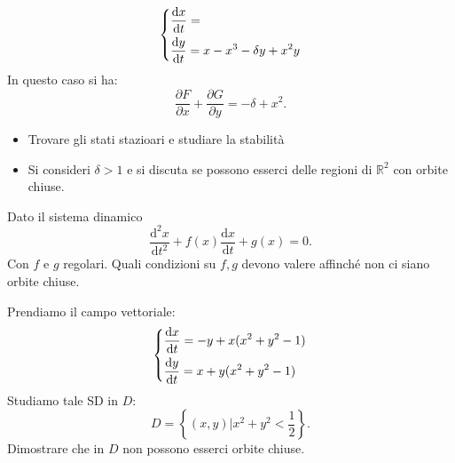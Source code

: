 \begin{ex}[]
    \[
    \begin{dcases}
    \frac{\text{d} x}{\text{d} t} = \\
    \frac{\text{d} y}{\text{d} t} = x-x^3-\delta y + x^2y
    \end{dcases}
    \]
    In questo caso si ha:
    \[
        \frac{\partial F}{\partial x} + \frac{\partial G}{\partial y} = -\delta  + x^2
    .\] 
    \begin{itemize}
        \item Trovare gli stati stazioari e studiare la stabilità
	\item Si consideri $\delta >1$ e si discuta se possono esserci delle regioni di $\mathbb{R}^2$ con orbite chiuse.
    \end{itemize}
\end{ex}
\noindent
\begin{ex}[]
    Dato il sistema dinamico 
    \[
	\frac{\text{d}^2 x}{\text{d} t^2} + f(x) \frac{\text{d} x}{\text{d} t} + g(x) = 0
    .\] 
    Con $f$ e $g$ regolari. Quali condizioni su $f, g$ devono valere affinché non ci siano orbite chiuse.

\end{ex}
\noindent
\begin{ex}[]
    Prendiamo il campo vettoriale:
    \[
    \begin{dcases}
	\frac{\text{d} x}{\text{d} t} = -y + x(x^2 + y^2 -1) \\
	\frac{\text{d} y}{\text{d} t} = x + y (x^2 + y^2 -1)
    \end{dcases}
    \]
    Studiamo tale SD in $D$:
    \[
	D = \left\{(x, y) | x^2 + y^2 < \frac{1}{2}\right\}
    .\] 
    Dimostrare che in $D$ non possono esserci orbite chiuse.
\end{ex}
\noindent
